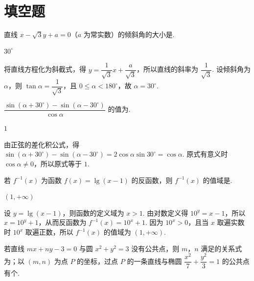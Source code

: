 \section{填空题}

\begin{problem}
直线 \(x-\sqrt3y+a=0\)（\(a\) 为常实数）的倾斜角的大小是\fillinblank{}.
\end{problem}

\begin{answer}
\(30^{\circ}\)
\end{answer}

\begin{solution}
将直线方程化为斜截式，得 \(y=\dfrac{1}{\sqrt3}x+\dfrac{a}{\sqrt3}\)，所以直线的斜率为 \(\dfrac{1}{\sqrt3}\). 设倾斜角为 \(\alpha\)，则 \(\tan\alpha=\dfrac{1}{\sqrt3}\)，且 \(0\leq\alpha<180^{\circ}\)，故 \(\alpha=30^{\circ}\).
\end{solution}

\begin{problem}
\(\dfrac{\sin(\alpha+30^{\circ})-\sin(\alpha-30^{\circ})}{\cos\alpha}\) 的值为\fillinblank{}.
\end{problem}

\begin{answer}
\(1\)
\end{answer}

\begin{solution}
由正弦的差化积公式，得 \(\sin(\alpha+30^{\circ})-\sin(\alpha-30^{\circ})=2\cos\alpha\sin30^{\circ}=\cos\alpha\). 原式有意义时 \(\cos\alpha\ne0\)，所以原式等于 \(1\).
\end{solution}

\begin{problem}
若 \(f^{-1}(x)\) 为函数 \(f(x)=\lg(x-1)\) 的反函数，则 \(f^{-1}(x)\) 的值域是\fillinblank{}.
\end{problem}

\begin{answer}
\((1,+\infty)\)
\end{answer}

\begin{solution}
设 \(y=\lg(x-1)\)，则函数的定义域为 \(x>1\). 由对数定义得 \(10^{y}=x-1\)，所以 \(x=10^{y}+1\)，从而反函数为 \(f^{-1}(x)=10^{x}+1\). 因为 \(10^{x}>0\)，且当 \(x\) 取遍实数时 \(10^{x}\) 取遍正数，所以 \(f^{-1}(x)\) 的值域为 \((1,+\infty)\).
\end{solution}

\begin{problem}
若直线 \(mx+ny-3=0\) 与圆 \(x^{2}+y^{2}=3\) 没有公共点，则 \(m\)，\(n\) 满足的关系式为\fillinblank{}；以 \((m,n)\) 为点 \(P\) 的坐标，过点 \(P\) 的一条直线与椭圆 \(\dfrac{x^{2}}7+\dfrac{y^{2}}3=1\) 的公共点有\fillinblank{}个.
\end{problem}

